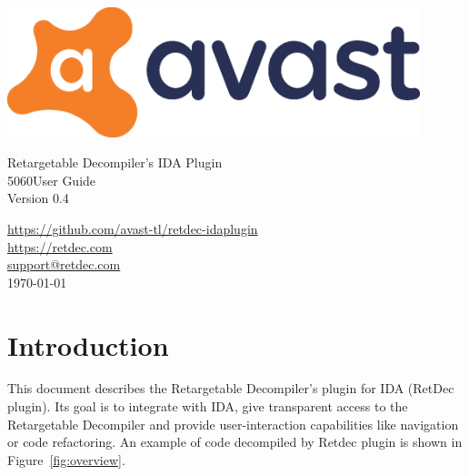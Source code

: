 \documentclass[pdftex, a4paper,12pt, oneside, svgnames]{article}
\makeatletter
\newcommand\HUGE{\@setfontsize\Huge{50}{60}}
\makeatother
\begin{document}

\begin{titlepage}
\begin{center}


\includegraphics[width=12cm]{figures/avast-logo-cmyk}

\vfill

{\LARGE Retargetable Decompiler's IDA Plugin}
\\[5 mm]
{\HUGE User Guide}
\\[3 mm]
{\large Version 0.4}

\vfill

{\LARGE
\href{https://github.com/avast-tl/retdec-idaplugin}{https://github.com/avast-tl/retdec-idaplugin} \\[2 mm]
\href{https://retdec.com}{https://retdec.com} \\[2 mm]
\href{mailto:support@retdec.com}{support@retdec.com} \\[4 mm]
\today}

\end{center}
\end{titlepage}


\tableofcontents

\newpage
\section{Introduction}
\label{sec:introduction}
This document describes the Retargetable Decompiler's plugin for IDA (RetDec plugin). Its goal is to integrate with IDA, give transparent access to the Retargetable Decompiler and provide user-interaction capabilities like navigation or code refactoring. An example of code decompiled by Retdec plugin is shown in Figure~\ref{fig:overview}.
\end{document}
